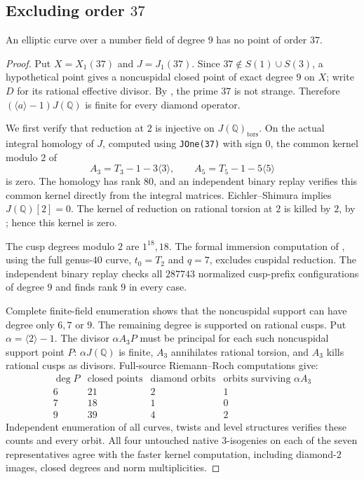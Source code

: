 \subsection{Excluding order $37$}
\begin{proposition}\label{prop:nonic37-exclusion}
An elliptic curve over a number field of degree $9$ has no point of order $37$.
\end{proposition}
\begin{proof}
Put $X=X_1(37)$ and $J=J_1(37)$.
Since $37\notin S(1)\cup S(3)$, a hypothetical point gives a
noncuspidal closed point of exact degree $9$ on $X$; write $D$ for
its rational effective divisor. By
\cite[Proposition~5.2 and Table~2]{DSPrime}, the prime $37$ is not
strange. Therefore $(\langle a\rangle-1)J(\mathbb Q)$ is finite
for every diamond operator.

We first verify that reduction at $2$ is injective on
$J(\mathbb Q)_{\mathrm{tors}}$.
On the actual integral homology of $J$, computed using
\texttt{JOne(37)} with sign $0$, the common kernel modulo $2$ of
\[
 A_3=T_3-1-3\langle3\rangle,\qquad
 A_5=T_5-1-5\langle5\rangle
\]
is zero. The homology has rank $80$, and an independent binary
replay verifies this common kernel directly from the integral
matrices. Eichler--Shimura implies $J(\mathbb Q)[2]=0$.
The kernel of reduction on rational torsion at $2$ is killed by $2$,
by \cite[proof of Proposition~3.4]{DKSS}; hence this kernel is zero.

The cusp degrees modulo $2$ are $1^{18},18$.
The formal immersion computation of
\cite[Corollary~4.4, Corollary~5.2 and Proposition~5.3]{DKSS},
using the full genus-$40$ curve, $t_0=T_2$ and $q=7$, excludes
cuspidal reduction. The independent binary replay checks all
$287743$ normalized cusp-prefix configurations of degree $9$ and
finds rank $9$ in every case.

Complete finite-field enumeration shows that the noncuspidal
support can have degree only $6,7$ or $9$. The remaining degree is
supported on rational cusps. Put $\alpha=\langle2\rangle-1$.
The divisor $\alpha A_3P$ must be principal for each such
noncuspidal support point $P$: $\alpha J(\mathbb Q)$ is finite,
$A_3$ annihilates rational torsion, and $A_3$ kills rational cusps
as divisors. Full-source Riemann--Roch computations give:
\[
\begin{array}{c|r|r|r}
\deg P&\text{closed points}&\text{diamond orbits}&
 \text{orbits surviving }\alpha A_3\\\hline
6&21&2&1\\
7&18&1&0\\
9&39&4&2
\end{array}
\]
Independent enumeration of all curves, twists and level structures
verifies these counts and every orbit. All four untouched native
$3$-isogenies on each of the seven representatives agree with the
faster kernel computation, including diamond-$2$ images, closed
degrees and norm multiplicities.


\end{proof}
